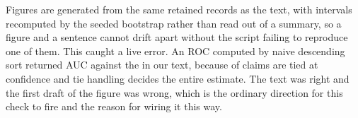 Figures are generated from the same retained records as the text, with intervals recomputed by the
seeded bootstrap rather than read out of a summary, so a figure and a sentence cannot drift apart
without the script failing to reproduce one of them. This caught a live error. An ROC computed by
naive descending sort returned AUC  against the
 in our text, because  of  claims
are tied at confidence  and tie handling decides the entire estimate. The text was right
and the first draft of the figure was wrong, which is the ordinary direction for this check to fire
and the reason for wiring it this way.
